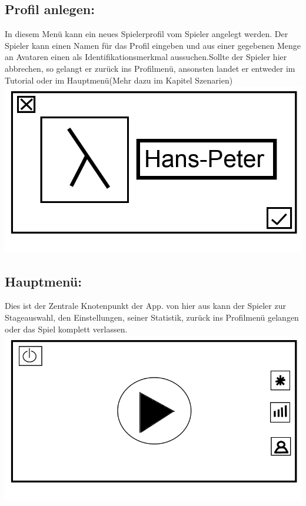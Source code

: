 \documentclass{scrartcl}
\begin{document}
\begin{enumerate}
	\begin{minipage}{1\textwidth}
		\item \subsection*{Profil anlegen:}
		In diesem Menü kann ein neues Spielerprofil vom Spieler angelegt werden. Der Spieler kann einen Namen für das Profil eingeben und aus einer gegebenen Menge an Avataren einen als Identifikationsmerkmal aussuchen.Sollte der Spieler hier abbrechen, so gelangt er zurück ins Profilmenü, ansonsten landet er entweder im Tutorial oder im Hauptmenü(Mehr dazu im Kapitel Szenarien)\\
		\includegraphics[width=\textwidth, height=7.5cm]{assets/CreateProfile}
	\end{minipage}
	
	\begin{minipage}{1\textwidth}
		\item \subsection*{Hauptmenü:}
		Dies ist der Zentrale Knotenpunkt der App. von hier aus kann der Spieler zur Stageauswahl, den Einstellungen, seiner Statistik, zurück ins Profilmenü gelangen oder das Spiel komplett verlassen.\\
		\includegraphics[width=\textwidth, height=7.5cm]{assets/Mainmenu}
	\end{minipage}
	

\end{enumerate}
\end{document}
